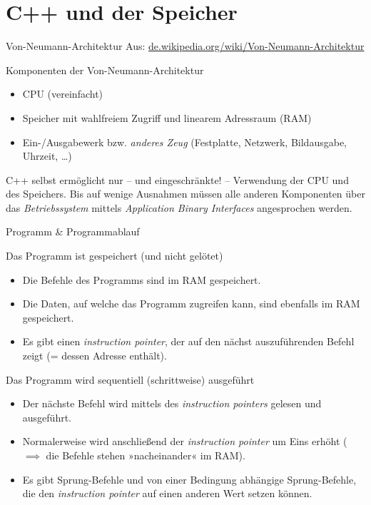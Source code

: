\section{C++ und der Speicher}


\begin{frame}{Von-Neumann-Architektur}
	Aus: \url{de.wikipedia.org/wiki/Von-Neumann-Architektur}
	
	\begin{block}{Komponenten der Von-Neumann-Architektur}
		\begin{itemize}
			\item CPU (vereinfacht)
			\item Speicher mit wahlfreiem Zugriff und linearem Adressraum (RAM)
			\item Ein-/Ausgabewerk bzw. \emph{anderes Zeug} (Festplatte, Netzwerk, Bildausgabe, Uhrzeit, \dots)
		\end{itemize}
	\end{block}
	
	\pause
	
	C++ selbst ermöglicht nur -- und eingeschränkte! -- Verwendung der CPU und des Speichers. Bis auf wenige Ausnahmen müssen alle anderen Komponenten über das \emph{Betriebssystem} mittels \emph{Application Binary Interfaces} angesprochen werden.
\end{frame}

\begin{frame}{Programm \& Programmablauf}
	\footnotesize
	
	\begin{block}{Das Programm ist gespeichert (und nicht gelötet)}
		\begin{itemize}
			\item Die Befehle des Programms sind im RAM gespeichert.
			\item Die Daten, auf welche das Programm zugreifen kann, sind ebenfalls im RAM gespeichert.
			\item Es gibt einen \emph{instruction pointer}, der auf den nächst auszuführenden Befehl zeigt (= dessen Adresse enthält).
		\end{itemize}
	\end{block}
	
	\pause
	
	\begin{block}{Das Programm wird sequentiell (schrittweise) ausgeführt}
		\begin{itemize}
			\item Der nächste Befehl wird mittels des \emph{instruction pointers} gelesen und ausgeführt.
			\item Normalerweise wird anschließend der \emph{instruction pointer} um Eins erhöht ($\implies$ die Befehle stehen »nacheinander« im RAM).
			\item Es gibt Sprung-Befehle und von einer Bedingung abhängige Sprung-Befehle, die den \emph{instruction pointer} auf einen anderen Wert setzen können.
		\end{itemize}
	\end{block}
\end{frame}

